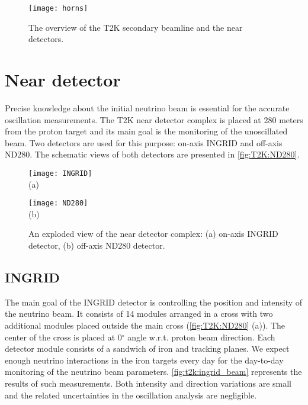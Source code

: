 \documentclass[../main.tex]{subfiles}
\begin{document}

\begin{figure}[!ht]
  \centering
  \texttt{[image: horns]}
  \caption{The overview of the T2K secondary beamline and the near detectors.}
  \label{fig:t2k:horns}
\end{figure}

\section{Near detector}
\label{sec:T2K:nd}
Precise knowledge about the initial neutrino beam is essential for the accurate oscillation measurements. The T2K near detector complex is placed at 280 meters from the proton target and its main goal is the monitoring of the unoscillated beam. Two detectors are used for this purpose: on-axis INGRID and off-axis ND280. The schematic views of both detectors are presented in \autoref{fig:T2K:ND280}.

\begin{figure}[!ht]
  \centering
  \begin{minipage}{0.49\linewidth}
    \centering
    \texttt{[image: INGRID]} \\ (a)
  \end{minipage}
  \begin{minipage}{0.49\linewidth}
    \centering
    \texttt{[image: ND280]} \\ (b)
  \end{minipage}
    \caption{An exploded view of the near detector complex: (a) on-axis INGRID detector, (b) off-axis ND280 detector.}
    \label{fig:T2K:ND280}
\end{figure}

\subsection{INGRID}
The main goal of the INGRID detector is controlling the position and intensity of the neutrino beam. It consists of 14 modules arranged in a cross with two additional modules placed outside the main cross (\autoref{fig:T2K:ND280} (a)). The center of the cross is placed at 0$^\circ$ angle w.r.t. proton beam direction. Each detector module consists of a sandwich of iron and tracking planes. We expect enough neutrino interactions in the iron targets every day for the day-to-day monitoring of the neutrino beam parameters. \autoref{fig:t2k:ingrid_beam} represents the results of such measurements. Both intensity and direction variations are small and the related uncertainties in the oscillation analysis are negligible.
\end{document}
